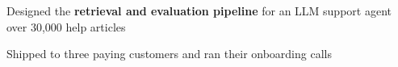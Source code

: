 \begin{bullets}
  \item Designed the \textbf{retrieval and evaluation pipeline} for an LLM support agent over 30,000 help articles
  \item Shipped to three paying customers and ran their onboarding calls
\end{bullets}
